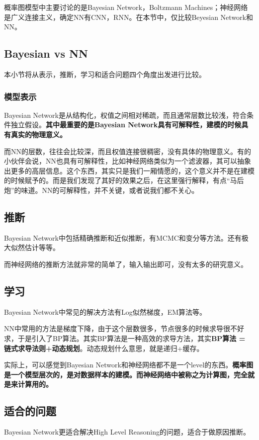 \documentclass[a4paper]{article}
\begin{document}
概率图模型中主要讨论的是Bayesian Network，Boltzmann Machines；神经网络是广义连接主义，确定NN有CNN，RNN。在本节中，仅比较Beyesian Network和NN。

\subsection{Bayesian vs NN}
本小节将从表示，推断，学习和适合问题四个角度出发进行比较。

\subsubsection{模型表示}
Bayesian Network是从结构化，权值之间相对稀疏，而且通常层数比较浅，符合条件独立假设。\textbf{其中最重要的是Bayesian Network具有可解释性，建模的时候具有真实的物理意义。}

而NN的层数，往往会比较深，而且权值连接很稠密，没有具体的物理意义。有的小伙伴会说，NN也具有可解释性，比如神经网络类似为一个滤波器，其可以抽象出更多的高层信息。这个东西，其实只是我们一厢情愿的，这个意义并不是在建模的时候赋予的。而是我们发现了其好的效果之后，在这里强行解释，有点“马后炮”的味道。NN的可解释性，并不关键，或者说我们都不关心。

\subsection{推断}
Bayesian Network中包括精确推断和近似推断，有MCMC和变分等方法。还有极大似然估计等等。

而神经网络的推断方法就非常的简单了，输入输出即可，没有太多的研究意义。

\subsection{学习}
Bayesian Network中常见的解决方法有Log似然梯度，EM算法等。

NN中常用的方法是梯度下降，由于这个层数很多，节点很多的时候求导很不好求，于是引入了BP算法。其实BP算法是一种高效的求导方法，其实\textbf{BP算法 = 链式求导法则+动态规划}。动态规划什么意思，就是递归+缓存。

实际上，可以感觉到Bayesian Network和神经网络都不是一个level的东西。\textbf{概率图是一个模型层次的，是对数据样本的建模。而神经网络中被称之为计算图，完全就是来计算用的。}

\subsection{适合的问题}
Bayesian Network更适合解决High Level Reasoning的问题，适合于做原因推断。
\end{document}
